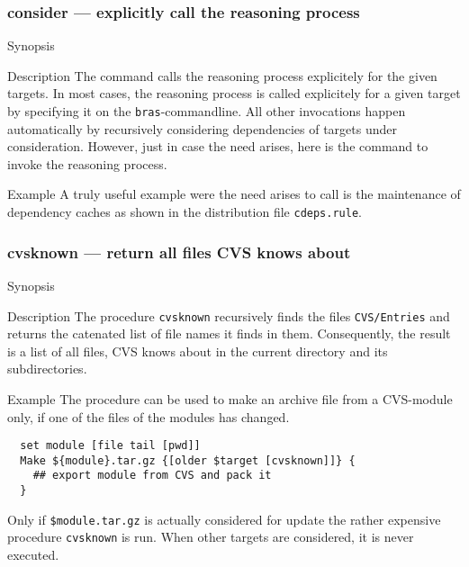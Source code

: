 \documentclass[11pt]{scrartcl}
\newcommand{\bras}{\texttt{bras}}
\begin{document}
\subsubsection{consider --- explicitly call the reasoning process}
\begin{Describe}
\item[Synopsis]  
\item[Description] The command calls the reasoning process explicitely
  for the given targets. In most cases, the reasoning process is
  called explicitely for a given target by specifying it on the
  \bras-commandline. All other invocations happen automatically by
  recursively considering dependencies of targets under consideration.
  However, just in case the need arises, here is the command to invoke
  the reasoning process.
\item[Example] A truly useful example were the need arises to call
   is the maintenance of dependency caches as shown in
  the distribution file \texttt{cdeps.rule}.
\end{Describe}

\subsubsection{cvsknown --- return all files CVS knows about}
\begin{Describe}
\item[Synopsis] 
\item[Description] The procedure \texttt{cvsknown} recursively finds
  the files \texttt{CVS/Entries} and returns the catenated list of
  file names it finds in them. Consequently, the result is a list of
  all files, CVS knows about in the current directory and its
  subdirectories.
\item[Example]
The procedure can be used to make an archive file from a CVS-module
only, if one of the files of the modules has changed. 
\begin{verbatim}
  set module [file tail [pwd]]
  Make ${module}.tar.gz {[older $target [cvsknown]]} {
    ## export module from CVS and pack it
  }
\end{verbatim}
Only if \texttt{\$module.tar.gz} is actually considered for update the
rather expensive procedure \texttt{cvsknown} is run. When other
targets are considered, it is never executed.
\end{Describe}
\end{document}

